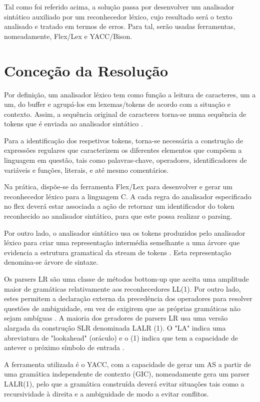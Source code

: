 \documentclass{report}
\begin{document}
Tal como foi referido acima, a solução passa por desenvolver um analisador sintático auxiliado por um reconhecedor léxico, cujo resultado será o texto analisado e tratado em termos de erros. Para tal, serão usadas ferramentas, nomeadamente, Flex/Lex e YACC/Bison.

\chapter{Conceção da Resolução}

Por definição, um analisador léxico tem como função a leitura de caracteres, um a um, do buffer e agrupá-los em lexemas/tokens de acordo com a situação e contexto. Assim, a sequência original de caracteres torna-se numa sequência de tokens que é enviada ao analisador sintático \cite{su2011principles}.

Para a identificação dos respetivos tokens, torna-se necessária a construção de expressões regulares que caracterizem os diferentes elementos que compõem a linguagem em questão, tais como palavras-chave, operadores, identificadores de variáveis e funções, literais, e até mesmo comentários.

Na prática, dispõe-se da ferramenta Flex/Lex para desenvolver e gerar um reconhecedor léxico para a linguagem C. A cada regra do analisador especificado no flex deverá estar associada a ação de retornar um identificador do token reconhecido ao analisador sintático, para que este possa realizar o parsing.

Por outro lado, o analisador sintático usa os tokens produzidos pelo analisador léxico para criar uma representação intermédia semelhante a uma árvore que evidencia a estrutura gramatical da stream de tokens \cite{aho1986compilers}. Esta representação denomina-se árvore de sintaxe. 

Os parsers LR são uma classe de métodos bottom-up que aceita uma amplitude maior de gramáticas relativamente aos reconhecedores LL(1). Por outro lado, estes permitem a declaração externa da precedência dos operadores para resolver questões de ambiguidade, em vez de exigirem que as próprias gramáticas não sejam ambíguas \cite{mogensen2009basics}. A maioria dos geradores de parsers LR usa uma versão alargada da construção SLR denominada LALR (1). O "LA" indica uma abreviatura de "lookahead" (oráculo) e o (1) indica que tem a capacidade  de antever o próximo símbolo de entrada \cite{mogensen2009basics}. 

A ferramenta utilizada é o YACC, com a capacidade de gerar um AS a partir de uma gramática independente de contexto (GIC), nomeadamente gera um parser LALR(1), pelo que a gramática construída deverá evitar situações tais como a recursividade à direita e a ambiguidade de modo a evitar conflitos.
\end{document}
